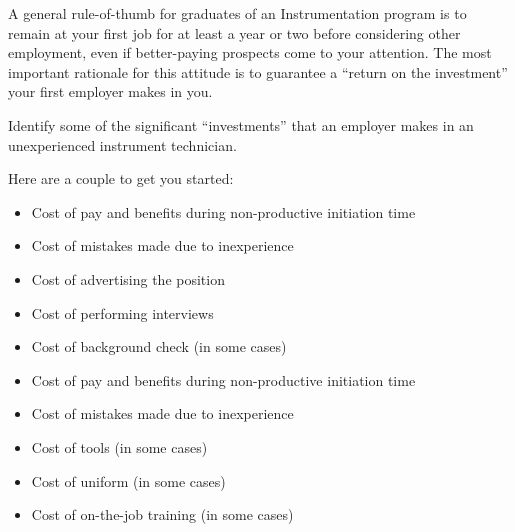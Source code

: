

A general rule-of-thumb for graduates of an Instrumentation program is to remain at your first job for at least a year or two before considering other employment, even if better-paying prospects come to your attention.  The most important rationale for this attitude is to guarantee a ``return on the investment'' your first employer makes in you.  

\vskip 10pt

Identify some of the significant ``investments'' that an employer makes in an unexperienced instrument technician.  

\vskip 50pt







Here are a couple to get you started:

\begin{itemize}
\item{} Cost of pay and benefits during non-productive initiation time
\item{} Cost of mistakes made due to inexperience
\end{itemize}







\begin{itemize}
\item{} Cost of advertising the position
\item{} Cost of performing interviews
\item{} Cost of background check (in some cases)
\item{} Cost of pay and benefits during non-productive initiation time
\item{} Cost of mistakes made due to inexperience
\item{} Cost of tools (in some cases)
\item{} Cost of uniform (in some cases)
\item{} Cost of on-the-job training (in some cases)
\end{itemize}

